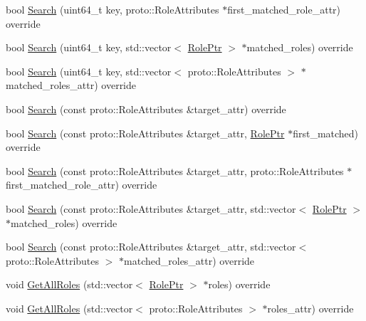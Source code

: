 \begin{DoxyCompactItemize}
\item 
bool \hyperlink{classapollo_1_1cyber_1_1service__discovery_1_1MultiValueWarehouse_a709b52d620cf7b32e47555fc507d79db}{Search} (uint64\-\_\-t key, proto\-::\-Role\-Attributes $\ast$first\-\_\-matched\-\_\-role\-\_\-attr) override
\item 
bool \hyperlink{classapollo_1_1cyber_1_1service__discovery_1_1MultiValueWarehouse_aa5330ff3c6788887b1373e6878f1816f}{Search} (uint64\-\_\-t key, std\-::vector$<$ \hyperlink{namespaceapollo_1_1cyber_1_1service__discovery_a47c65bbb4b41d9ae41bfbd33271df525}{Role\-Ptr} $>$ $\ast$matched\-\_\-roles) override
\item 
bool \hyperlink{classapollo_1_1cyber_1_1service__discovery_1_1MultiValueWarehouse_acc3ed44f34a5b8736b8a2f3c3ff5593b}{Search} (uint64\-\_\-t key, std\-::vector$<$ proto\-::\-Role\-Attributes $>$ $\ast$matched\-\_\-roles\-\_\-attr) override
\item 
bool \hyperlink{classapollo_1_1cyber_1_1service__discovery_1_1MultiValueWarehouse_af5dca21f644c0f2d1d10f5dd68996823}{Search} (const proto\-::\-Role\-Attributes \&target\-\_\-attr) override
\item 
bool \hyperlink{classapollo_1_1cyber_1_1service__discovery_1_1MultiValueWarehouse_a1fdf37b96214172a0a9a0f988a6278ec}{Search} (const proto\-::\-Role\-Attributes \&target\-\_\-attr, \hyperlink{namespaceapollo_1_1cyber_1_1service__discovery_a47c65bbb4b41d9ae41bfbd33271df525}{Role\-Ptr} $\ast$first\-\_\-matched) override
\item 
bool \hyperlink{classapollo_1_1cyber_1_1service__discovery_1_1MultiValueWarehouse_a4221f9d02cc798048b0273504a9311f8}{Search} (const proto\-::\-Role\-Attributes \&target\-\_\-attr, proto\-::\-Role\-Attributes $\ast$first\-\_\-matched\-\_\-role\-\_\-attr) override
\item 
bool \hyperlink{classapollo_1_1cyber_1_1service__discovery_1_1MultiValueWarehouse_acb403c3473dbdf772bd98ed3dc9fcb81}{Search} (const proto\-::\-Role\-Attributes \&target\-\_\-attr, std\-::vector$<$ \hyperlink{namespaceapollo_1_1cyber_1_1service__discovery_a47c65bbb4b41d9ae41bfbd33271df525}{Role\-Ptr} $>$ $\ast$matched\-\_\-roles) override
\item 
bool \hyperlink{classapollo_1_1cyber_1_1service__discovery_1_1MultiValueWarehouse_ad82b63e4466fb527f021620c282ed371}{Search} (const proto\-::\-Role\-Attributes \&target\-\_\-attr, std\-::vector$<$ proto\-::\-Role\-Attributes $>$ $\ast$matched\-\_\-roles\-\_\-attr) override
\item 
void \hyperlink{classapollo_1_1cyber_1_1service__discovery_1_1MultiValueWarehouse_a986c2ba47627ee7abfddd86425412eb1}{Get\-All\-Roles} (std\-::vector$<$ \hyperlink{namespaceapollo_1_1cyber_1_1service__discovery_a47c65bbb4b41d9ae41bfbd33271df525}{Role\-Ptr} $>$ $\ast$roles) override
\item 
void \hyperlink{classapollo_1_1cyber_1_1service__discovery_1_1MultiValueWarehouse_aa1b70c69f72cd975095b7624a6b83e3f}{Get\-All\-Roles} (std\-::vector$<$ proto\-::\-Role\-Attributes $>$ $\ast$roles\-\_\-attr) override
\end{DoxyCompactItemize}
